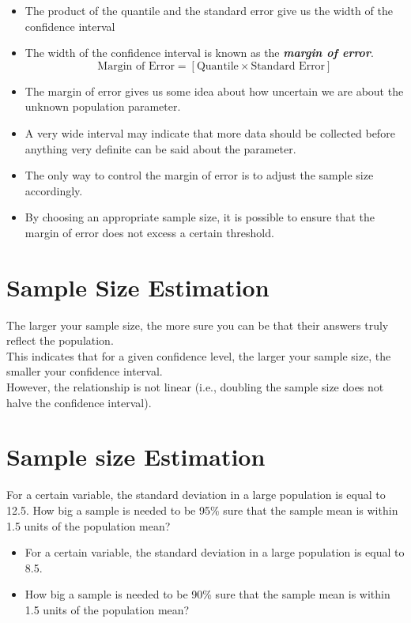 \begin{itemize}
\item The product of the quantile and the standard error give us the width of the confidence interval
\item The width of the confidence interval is known as the \textbf{\emph{margin of error}}.  \[ \mbox{Margin of Error}  = \left[ \mbox{Quantile} \times \mbox{Standard Error} \right] \]
\item The margin of error gives us some idea about how uncertain we are about the unknown population parameter. \item A very wide interval may indicate that more data should be collected before anything very definite can be said about the parameter.
\item The only way to control the margin of error is to adjust the sample size accordingly.
\item By choosing an appropriate sample size, it is possible to ensure that the margin of error does not excess a certain threshold.
\end{itemize}



\section{Sample Size Estimation}

The larger your sample size, the more sure you can be that their answers truly reflect the population.\\ This indicates that for a given confidence level, the larger your sample size, the smaller your confidence interval. \\However, the relationship is not linear (i.e., doubling the sample size does not halve the confidence interval).

\section{Sample size Estimation}
For a certain variable, the standard deviation in a large population is equal to 12.5.
How big a sample is needed to be 95\% sure that the sample mean is within 1.5 units of the population mean?


\begin{itemize}
\item For a certain variable, the standard deviation in a large population is equal to 8.5.
\item How big a sample is needed to be 90\% sure that the sample mean is within 1.5
units of the population mean?
\end{itemize}





